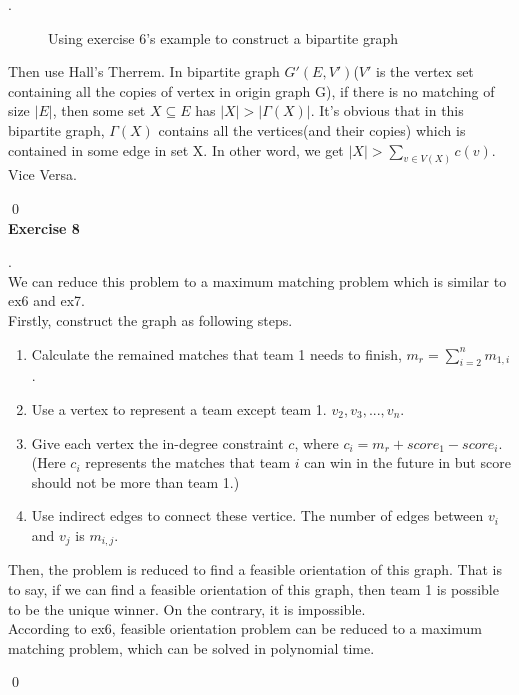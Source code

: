 \documentclass[12pt, notitlepage]{article}
\newenvironment{sol}
  {\par\vspace{3mm}\noindent{\it Solution}.}{\qed}
\begin{document}
\begin{sol}
\begin{enumerate}[1.]
\begin{figure}[H]
	\caption{Using exercise 6's example to construct a bipartite graph}
\end{figure}
Then use Hall's Therrem. In bipartite graph $G'(E,V')$($V'$ is the vertex set containing all the copies of vertex in origin graph G), if there is no matching of size $|E|$, then some set $X\subseteq E$ has $|X|>|\Gamma(X)|$. It's obvious that in this bipartite graph, $\Gamma(X)$ contains all the vertices(and their copies) which is contained in some edge in set X. In other word, we get $|X|>\sum_{v\in V(X)}c(v)$. Vice Versa.
\end{enumerate}
\end{sol}\\

\textbf{Exercise 8}
\begin{sol}\\
We can reduce this problem to a maximum matching problem which is similar to ex6 and ex7.\\
Firstly, construct the graph as following steps.
\begin{enumerate}[1.]
 	\item Calculate the remained matches that team 1 needs to finish, $m_r = \sum_{i=2}^{n}m_{1,i}$.
 	\item Use a vertex to represent a team except team 1. $v_2,v_3,...,v_n$.
 	\item Give each vertex the in-degree constraint $c$, where $c_i = m_r + score_1 - score_i$. (Here $c_i$ represents the matches that team $i$ can win in the future in but score should not be more than team 1.)
 	\item Use indirect edges to connect these vertice. The number of edges between $v_i$ and $v_j$ is $m_{i,j}$.
\end{enumerate}

Then, the problem is reduced to find a feasible orientation of this graph. That is to say, if we can find a feasible orientation of this graph, then team 1 is possible to be the unique winner. On the contrary, it is impossible.\\
According to ex6, feasible orientation problem can be reduced to a maximum matching problem, which can be solved in polynomial time.



\end{sol}\\
\end{document}
